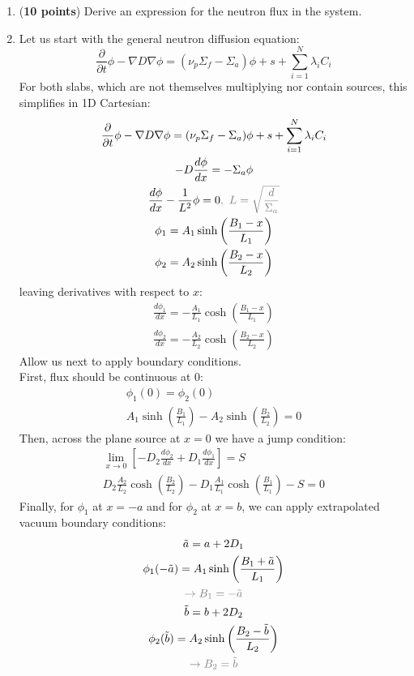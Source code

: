 \documentclass[11pt]{article}
\newcommand{\ans}[1]{{\color{violet}#1}}
\newcommand{\ddt}{\frac{\partial}{\partial t}}
\begin{document}
\begin{enumerate}
\item[(a)] ({\bf 10 points}) Derive an expression for the neutron flux in the system.
\item[] \ans{
    Let us start with the general neutron diffusion equation:
    \begin{equation}
        \ddt\phi-\nabla D\nabla\phi = (\nu_p\Sigma_f - \Sigma_a)\phi + s + \sum_{i=1}^{N}\lambda_iC_i
    \end{equation}
    For both slabs, which are not themselves multiplying nor contain sources, this simplifies in 1D Cartesian:
    \begin{gather*}
        \ddt\phi-\nabla D\nabla\phi = (\nu_p\Sigma_f - \Sigma_a)\phi + s + \sum_{i=1}^{N}\lambda_iC_i\\
        -D\frac{d\phi}{dx}=-\Sigma_a\phi\\
        \frac{d\phi}{dx}-\frac{1}{L^2}\phi=0\color{gray},~L=\sqrt{\frac{d}{\Sigma_a}}\\
        \phi_1=A_1\sinh\left(\frac{B_1-x}{L_1}\right)\\
        \phi_2=A_2\sinh\left(\frac{B_2-x}{L_2}\right)
    \end{gather*}
    leaving derivatives with respect to $x$:
    \begin{gather*}
        \frac{d\phi_1}{dx}=-\frac{A_1}{L_1}\cosh\left(\frac{B_1-x}{L_1}\right)\\
        \frac{d\phi_2}{dx}=-\frac{A_2}{L_2}\cosh\left(\frac{B_2-x}{L_2}\right)
    \end{gather*}
    Allow us next to apply boundary conditions.\\

    First, flux should be continuous at 0:
    \begin{gather*}
        \phi_1(0)=\phi_2(0) \\
        A_1\sinh\left(\frac{B_1}{L_1}\right) - A_2\sinh\left(\frac{B_2}{L_2}\right)=0
    \end{gather*}
    Then, across the plane source at $x=0$ we have a jump condition:
    \begin{gather*}
        \lim_{x\rightarrow0}\left[-D_2\frac{d\phi_2}{dx}+D_1\frac{d\phi_1}{dx}\right]=S\\
        D_2\frac{A_2}{L_2}\cosh\left(\frac{B_2}{L_2}\right)-D_1\frac{A_1}{L_1}\cosh\left(\frac{B_1}{L_1}\right)-S=0
    \end{gather*}
    Finally, for $\phi_1$ at $x=-a$ and for $\phi_2$ at $x=b$, we can apply extrapolated vacuum boundary conditions:
    \begin{gather*}
        \tilde{a}=a+2D_1\\
        \phi_1(-\tilde{a})=A_1\sinh\left(\frac{B_1+\tilde{a}}{L_1}\right)\\
        \color{gray}\rightarrow B_1=-\tilde{a}\\
        \tilde{b}=b+2D_2\\
        \phi_2(\tilde{b})=A_2\sinh\left(\frac{B_2-\tilde{b}}{L_2}\right)\\
        \color{gray}\rightarrow B_2=\tilde{b}
    \end{gather*}

}
\end{enumerate}
\end{document}
